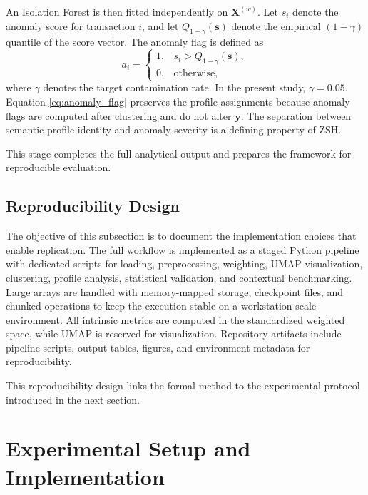 \documentclass{ieeeaccess}
\begin{document}
An Isolation Forest is then fitted independently on $\mathbf{X}^{(w)}$. Let $s_i$ denote the anomaly score for transaction $i$, and let $Q_{1-\gamma}\left(\mathbf{s}\right)$ denote the empirical $(1-\gamma)$ quantile of the score vector. The anomaly flag is defined as
\begin{equation}
a_i =
\begin{cases}
1, & s_i > Q_{1-\gamma}\left(\mathbf{s}\right), \\
0, & \text{otherwise},
\end{cases}
\label{eq:anomaly_flag}
\end{equation}
where $\gamma$ denotes the target contamination rate. In the present study, $\gamma = 0.05$. Equation \eqref{eq:anomaly_flag} preserves the profile assignments because anomaly flags are computed after clustering and do not alter $\mathbf{y}$. The separation between semantic profile identity and anomaly severity is a defining property of ZSH.

This stage completes the full analytical output and prepares the framework for reproducible evaluation.

\subsection{Reproducibility Design}

The objective of this subsection is to document the implementation choices that enable replication. The full workflow is implemented as a staged Python pipeline with dedicated scripts for loading, preprocessing, weighting, UMAP visualization, clustering, profile analysis, statistical validation, and contextual benchmarking. Large arrays are handled with memory-mapped storage, checkpoint files, and chunked operations to keep the execution stable on a workstation-scale environment. All intrinsic metrics are computed in the standardized weighted space, while UMAP is reserved for visualization. Repository artifacts include pipeline scripts, output tables, figures, and environment metadata for reproducibility.

This reproducibility design links the formal method to the experimental protocol introduced in the next section.

\section{Experimental Setup and Implementation}
\end{document}
